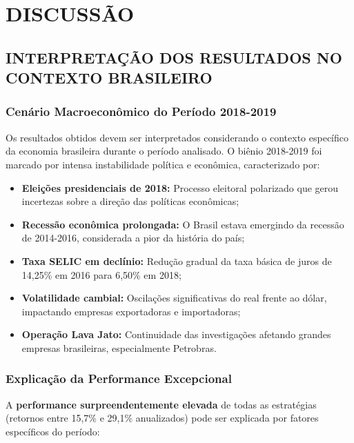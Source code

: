 
\chapter{DISCUSSÃO}

\section{INTERPRETAÇÃO DOS RESULTADOS NO CONTEXTO BRASILEIRO}

\subsection{Cenário Macroeconômico do Período 2018-2019}

Os resultados obtidos devem ser interpretados considerando o contexto específico da economia brasileira durante o período analisado. O biênio 2018-2019 foi marcado por intensa instabilidade política e econômica, caracterizado por:

\begin{itemize}
    \item \textbf{Eleições presidenciais de 2018:} Processo eleitoral polarizado que gerou incertezas sobre a direção das políticas econômicas;
    \item \textbf{Recessão econômica prolongada:} O Brasil estava emergindo da recessão de 2014-2016, considerada a pior da história do país;
    \item \textbf{Taxa SELIC em declínio:} Redução gradual da taxa básica de juros de 14,25\% em 2016 para 6,50\% em 2018;
    \item \textbf{Volatilidade cambial:} Oscilações significativas do real frente ao dólar, impactando empresas exportadoras e importadoras;
    \item \textbf{Operação Lava Jato:} Continuidade das investigações afetando grandes empresas brasileiras, especialmente Petrobras.
\end{itemize}

\subsection{Explicação da Performance Excepcional}

A \textbf{performance surpreendentemente elevada} de todas as estratégias (retornos entre 15,7\% e 29,1\% anualizados) pode ser explicada por fatores específicos do período:

